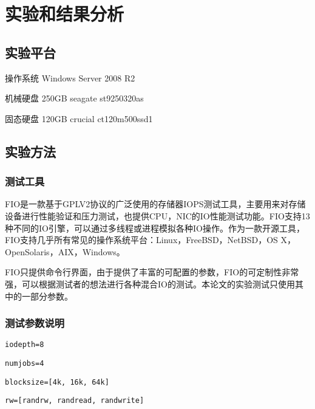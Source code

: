 
\chapter{实验和结果分析}
\label{cha:exp_analysis}

\section{实验平台}
\label{sec:exp_platform}

操作系统 Windows Server 2008 R2

机械硬盘 250GB seagate st9250320as

固态硬盘 120GB crucial ct120m500ssd1

\section{实验方法}
\label{sec:exp_method}

\subsection{测试工具}
FIO是一款基于GPLV2协议的广泛使用的存储器IOPS测试工具，主要用来对存储设备进行性能验证和压力测试，也提供CPU，NIC的IO性能测试功能。FIO支持13种不同的IO引擎，可以通过多线程或进程模拟各种IO操作。作为一款开源工具，FIO支持几乎所有常见的操作系统平台：Linux，FreeBSD，NetBSD，OS X，OpenSolaris，AIX，Windows。

FIO只提供命令行界面，由于提供了丰富的可配置的参数，FIO的可定制性非常强，可以根据测试者的想法进行各种混合IO的测试。本论文的实验测试只使用其中的一部分参数。

\subsection{测试参数说明}
\begin{lstlisting}
iodepth=8
\end{lstlisting}

\begin{lstlisting}
numjobs=4
\end{lstlisting}

\begin{lstlisting}
blocksize=[4k, 16k, 64k]
\end{lstlisting}

\begin{lstlisting}
rw=[randrw, randread, randwrite]
\end{lstlisting}

